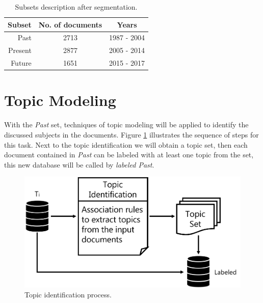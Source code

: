 \begin{table}[h!]
	\centering
	\caption{Subsets description after segmentation.}
	\label{tab:database-description}
	\begin{tabular}{r|cc}
		 Subset & No. of documents &    Years    \\ \hline
		   Past &       2713       & 1987 - 2004 \\
		Present &       2877       & 2005 - 2014 \\
		 Future &       1651       & 2015 - 2017
	\end{tabular}
\end{table}

\section{Topic Modeling}

With the \textit{Past} set, techniques of topic modeling will be applied to identify the discussed subjects in the documents. Figure \ref{fig:topic-identification} illustrates the sequence of steps for this task. Next to the topic identification we will obtain a topic set, then each document contained in \textit{Past} can be labeled with at least one topic from the set, this new database will be called by \textit{labeled Past}.

\begin{figure}[h!]
	\centering
	\includegraphics[width=0.7\linewidth]{01.Chapters/04.Materials/topic-identification}
	\caption{Topic identification process.}
	\label{fig:topic-identification}
\end{figure}




	

